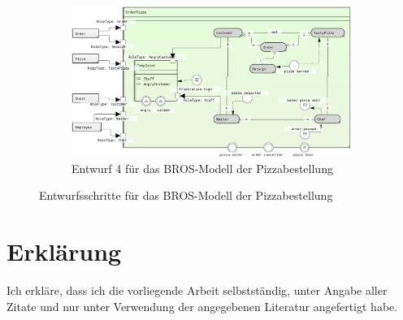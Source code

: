 \begin{figure}
\begin{subfigure}{0.8\textwidth}
        \label{fig:pizzaBros4}
    \end{subfigure}
    \begin{subfigure}{0.8\textwidth}
        \centering
        \includegraphics[width=\textwidth,keepaspectratio]{../images/example/bros-rule5.png}%
        \caption{Entwurf 4 für das BROS-Modell der Pizzabestellung}%
        \label{fig:pizzaBros5}
    \end{subfigure}
    \caption{Entwurfsschritte für das BROS-Modell der Pizzabestellung}%
    \label{fig:pizzaBrosSteps}
\end{figure}

\begin{figure}
    
\end{figure}

\chapter*{Erklärung}

Ich erkläre, dass ich die vorliegende Arbeit selbstständig, unter Angabe aller Zitate und nur unter Verwendung der angegebenen Literatur angefertigt habe.

\begin{figure}[H]
    \centering
\end{figure}
